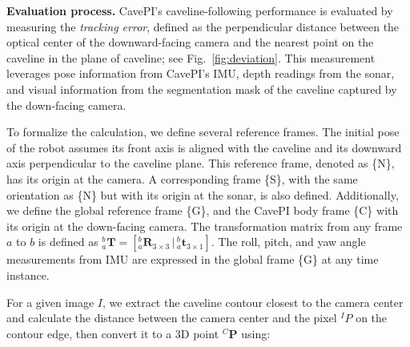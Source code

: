 \vspace{1mm}
\noindent
\textbf{Evaluation process.}  CavePI's caveline-following performance is evaluated by measuring the \textit{tracking error}, defined as the perpendicular distance between the optical center of the downward-facing camera and the nearest point on the caveline in the plane of caveline; see Fig.~\ref{fig:deviation}. This measurement leverages pose information from CavePI's IMU, depth readings from the sonar, and visual information from the segmentation mask of the caveline captured by the down-facing camera.

To formalize the calculation, we define several reference frames. The initial pose of the robot assumes its front axis is aligned with the caveline and its downward axis perpendicular to the caveline plane. This reference frame, denoted as \{N\}, has its origin at the camera. A corresponding frame \{S\}, with the same orientation as \{N\} but with its origin at the sonar, is also defined. Additionally, we define the global reference frame \{G\}, and the CavePI body frame \{C\} with its origin at the down-facing camera. The transformation matrix from any frame $a$ to $b$ is defined as ${}^{b}_{a}\mathbf{T} = [ {}^{b}_{a}\mathbf{R}_{3\times3} \,|\, {}^{b}_{a}\mathbf{t}_{3\times1}]$. The roll, pitch, and yaw angle measurements from IMU are expressed in the global frame \{G\} at any time instance.

For a given image $I$, we extract the caveline contour closest to the camera center and calculate the distance between the camera center and the pixel ${}^IP$ on the contour edge, then convert it to a 3D point ${}^C\boldsymbol{P}$ using:

